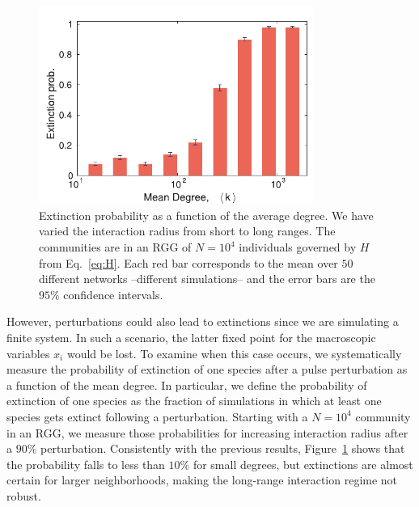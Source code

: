 \begin{figure}[t!]
 \centering
 \includegraphics[width=0.8\textwidth]{figures/chp1/fig7.pdf}
  \caption[Extinction probability as a function of the average degree]{ Extinction probability as a function of the average degree. We have varied the interaction radius from short to long ranges. The communities are in an RGG of $N=10^4$ individuals governed by $H$ from Eq.~\eqref{eq:H}. Each red bar corresponds to the mean over $50$ different networks --different simulations-- and the error bars are the $95\%$ confidence intervals.}
    \label{chp1:fig:7}
\end{figure}

However, perturbations could also lead to extinctions since we are simulating a finite system. In such a scenario, the latter fixed point for the macroscopic variables $x_i$ would be lost. To examine when this case occurs, we systematically measure the probability of extinction of one species after a pulse perturbation as a function of the mean degree. In particular, we define the probability of extinction of one species as the fraction of simulations in which at least one species gets extinct following a perturbation. Starting with a $N=10^4$ community in an RGG, we measure those probabilities for increasing interaction radius after a $90\%$ perturbation. Consistently with the previous results, Figure~\ref{chp1:fig:7} shows that the probability falls to less than $10\%$ for small degrees, but extinctions are almost certain for larger neighborhoods, making the long-range interaction regime not robust. \\

